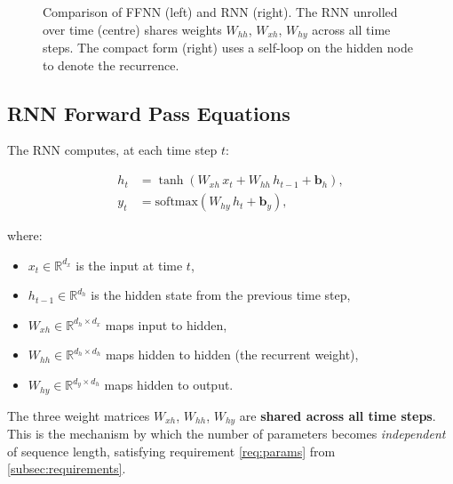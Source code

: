 \documentclass[12pt,a4paper]{article}
\newcommand{\xt}{x_t}
\newcommand{\ht}{h_t}
\newcommand{\yt}{y_t}
\newcommand{\Whh}{W_{hh}}
\newcommand{\Wxh}{W_{xh}}
\newcommand{\Why}{W_{hy}}
\begin{document}
\begin{figure}[ht]
  \caption{Comparison of FFNN (left) and RNN (right).  The RNN unrolled over
           time (centre) shares weights $\Whh$, $\Wxh$, $\Why$ across all
           time steps.  The compact form (right) uses a self-loop on the
           hidden node to denote the recurrence.}
  \label{fig:ffnn_vs_rnn}
\end{figure}

\subsection{RNN Forward Pass Equations}
\label{subsec:forward_pass}

The RNN computes, at each time step $t$:

\begin{align}
  \label{eq:rnn_hidden}
  \ht &= \tanh\!\left(\Wxh\, \xt + \Whh\, h_{t-1} + \mathbf{b}_h\right), \\
  \label{eq:rnn_output}
  \yt &= \text{softmax}\!\left(\Why\, \ht + \mathbf{b}_y\right),
\end{align}

where:
\begin{itemize}[nosep]
  \item $\xt \in \mathbb{R}^{d_x}$ is the input at time $t$,
  \item $h_{t-1} \in \mathbb{R}^{d_h}$ is the hidden state from the previous
        time step,
  \item $\Wxh \in \mathbb{R}^{d_h \times d_x}$ maps input to hidden,
  \item $\Whh \in \mathbb{R}^{d_h \times d_h}$ maps hidden to hidden
        (the recurrent weight),
  \item $\Why \in \mathbb{R}^{d_y \times d_h}$ maps hidden to output.
\end{itemize}

\begin{keyinsight}
The three weight matrices $\Wxh$, $\Whh$, $\Why$ are \textbf{shared across
all time steps}.  This is the mechanism by which the number of parameters
becomes \emph{independent} of sequence length, satisfying requirement
\ref{req:params} from \cref{subsec:requirements}.
\end{keyinsight}
\end{document}
